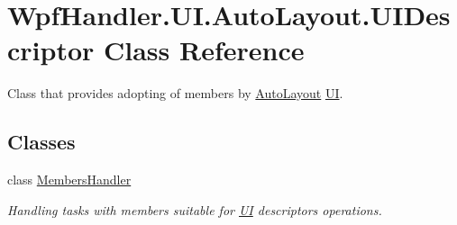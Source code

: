 \hypertarget{class_wpf_handler_1_1_u_i_1_1_auto_layout_1_1_u_i_descriptor}{}\section{Wpf\+Handler.\+U\+I.\+Auto\+Layout.\+U\+I\+Descriptor Class Reference}
\label{class_wpf_handler_1_1_u_i_1_1_auto_layout_1_1_u_i_descriptor}


Class that provides adopting of members by \mbox{\hyperlink{namespace_wpf_handler_1_1_u_i_1_1_auto_layout}{Auto\+Layout}} \mbox{\hyperlink{namespace_wpf_handler_1_1_u_i}{UI}}.  


\subsection*{Classes}
\begin{DoxyCompactItemize}
\item 
class \mbox{\hyperlink{class_wpf_handler_1_1_u_i_1_1_auto_layout_1_1_u_i_descriptor_1_1_members_handler}{Members\+Handler}}
\begin{DoxyCompactList}\small\item\em Handling tasks with members suitable for \mbox{\hyperlink{namespace_wpf_handler_1_1_u_i}{UI}} descriptor\textquotesingle{}s operations. \end{DoxyCompactList}\end{DoxyCompactItemize}
